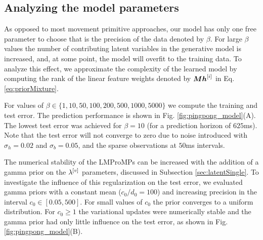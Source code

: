 \subsection{Analyzing the model parameters}

As opposed to most movement primitive approaches, our model has only one free parameter to
choose that is the precision of the data denoted by $\beta$. For large $\beta$
values the number of contributing 
latent variables in the generative model is increased, and, at some point, the
model will overfit to the training data.  To analyze this effect, we approximate 
the complexity of the learned model by computing the rank of the linear feature
weights denoted by $\boldsymbol{M}  \boldsymbol{h}^{[i]} $ in Eq. \eqref{eq:priorMixture}. 

For values of $\beta \in \{1, 10, 50, 100, 200, 500, 1000, 5000\}$ we compute
the training and test error. The prediction
performance is shown in Fig. \ref{fig:pingpong_model}(A). The lowest test error was
achieved for $\beta=10$ (for a prediction horizon of $625$ms).  Note that the test error will not converge to zero
due to noise introduced with $\sigma_h=0.02$ and $\sigma_b = 0.05$, and the
sparse observations at $50$ms intervals.




The numerical stability of the LMProMPs can be increased with the addition of a gamma
prior on the $ {\lambda^{[v]}} $ parameters, discussed in Subsection \ref{sec:latentSingle}. 
To investigate the influence of this regularization on the test error, we evaluated
gamma priors with a constant mean ($c_0/d_0=100$) and increasing precision in
the interval $c_0\in [0.05, 500]$. For small values of $c_0$ the prior converges
to a uniform distribution. For $c_0\ge1$ the variational updates were
numerically stable and the gamma prior had only little influence on the test
error, as shown in Fig. \ref{fig:pingpong_model}(B).
  
